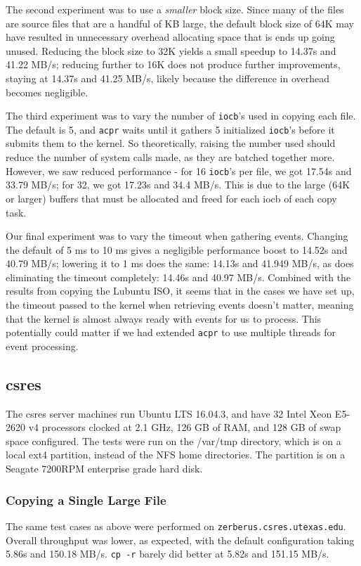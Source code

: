 \documentclass[11pt]{article}
\begin{document}
The second experiment was to use a \textit{smaller} block size. Since many of the files are source files that are a handful of KB large, the default block size of 64K may have resulted in unnecessary overhead allocating space that is ends up going unused. Reducing the block size to 32K yields a small speedup to 14.37s and 41.22 MB/s; reducing further to 16K does not produce further improvements, staying at 14.37s and 41.25 MB/s, likely because the difference in overhead becomes negligible.

The third experiment was to vary the number of \texttt{iocb}'s used in copying each file. The default is 5, and \texttt{acpr} waits until it gathers 5 initialized \texttt{iocb}'s before it submits them to the kernel. So theoretically, raising the number used should reduce the number of system calls made, as they are batched together more. However, we saw reduced performance - for 16 \texttt{iocb}'s per file, we got 17.54s and 33.79 MB/s; for 32, we got 17.23s and 34.4 MB/s. This is due to the large (64K or larger) buffers that must be allocated and freed for each iocb of each copy task.

Our final experiment was to vary the timeout when gathering events. Changing the default of 5 ms to 10 ms gives a negligible performance boost to 14.52s and 40.79 MB/s; lowering it to 1 ms does the same: 14.13s and 41.949 MB/s, as does eliminating the timeout completely: 14.46s and 40.97 MB/s. Combined with the results from copying the Lubuntu ISO, it seems that in the cases we have set up, the timeout passed to the kernel when retrieving events doesn't matter, meaning that the kernel is almost always ready with events for us to process. This potentially could matter if we had extended \texttt{acpr} to use multiple threads for event processing.

\subsection{csres}
The csres server machines run Ubuntu LTS 16.04.3, and have 32 Intel Xeon E5-2620 v4 processors clocked at 2.1 GHz, 126 GB of RAM, and 128 GB of swap space configured. The tests were run on the /var/tmp directory, which is on a local ext4 partition, instead of the NFS home directories. The partition is on a Seagate 7200RPM enterprise grade hard disk.

\subsubsection{Copying a Single Large File}
The same test cases as above were performed on \texttt{zerberus.csres.utexas.edu}. Overall throughput was lower, as expected, with the default configuration taking 5.86s and 150.18 MB/s. \texttt{cp -r} barely did better at 5.82s and 151.15 MB/s.
\end{document}
